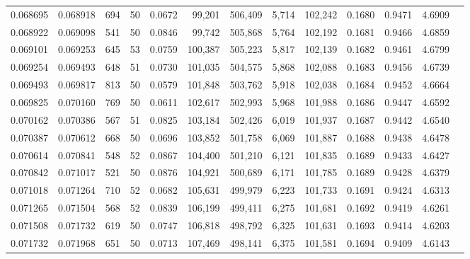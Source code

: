 \begin{tabular}{rrrrrrrrrrrrr}
0.068695 & 0.068918 &   694 &  50 &                                     0.0672 &  99,201 & 506,409 &   5,714 & 102,242 & 0.1680 & 0.9471 & 4.6909 \\
0.068922 & 0.069098 &   541 &  50 &                                     0.0846 &  99,742 & 505,868 &   5,764 & 102,192 & 0.1681 & 0.9466 & 4.6859 \\
0.069101 & 0.069253 &   645 &  53 &                                     0.0759 & 100,387 & 505,223 &   5,817 & 102,139 & 0.1682 & 0.9461 & 4.6799 \\
0.069254 & 0.069493 &   648 &  51 &                                     0.0730 & 101,035 & 504,575 &   5,868 & 102,088 & 0.1683 & 0.9456 & 4.6739 \\
0.069493 & 0.069817 &   813 &  50 &                                     0.0579 & 101,848 & 503,762 &   5,918 & 102,038 & 0.1684 & 0.9452 & 4.6664 \\
0.069825 & 0.070160 &   769 &  50 &                                     0.0611 & 102,617 & 502,993 &   5,968 & 101,988 & 0.1686 & 0.9447 & 4.6592 \\
0.070162 & 0.070386 &   567 &  51 &                                     0.0825 & 103,184 & 502,426 &   6,019 & 101,937 & 0.1687 & 0.9442 & 4.6540 \\
0.070387 & 0.070612 &   668 &  50 &                                     0.0696 & 103,852 & 501,758 &   6,069 & 101,887 & 0.1688 & 0.9438 & 4.6478 \\
0.070614 & 0.070841 &   548 &  52 &                                     0.0867 & 104,400 & 501,210 &   6,121 & 101,835 & 0.1689 & 0.9433 & 4.6427 \\
0.070842 & 0.071017 &   521 &  50 &                                     0.0876 & 104,921 & 500,689 &   6,171 & 101,785 & 0.1689 & 0.9428 & 4.6379 \\
0.071018 & 0.071264 &   710 &  52 &                                     0.0682 & 105,631 & 499,979 &   6,223 & 101,733 & 0.1691 & 0.9424 & 4.6313 \\
0.071265 & 0.071504 &   568 &  52 &                                     0.0839 & 106,199 & 499,411 &   6,275 & 101,681 & 0.1692 & 0.9419 & 4.6261 \\
0.071508 & 0.071732 &   619 &  50 &                                     0.0747 & 106,818 & 498,792 &   6,325 & 101,631 & 0.1693 & 0.9414 & 4.6203 \\
0.071732 & 0.071968 &   651 &  50 &                                     0.0713 & 107,469 & 498,141 &   6,375 & 101,581 & 0.1694 & 0.9409 & 4.6143 \\

\end{tabular}
